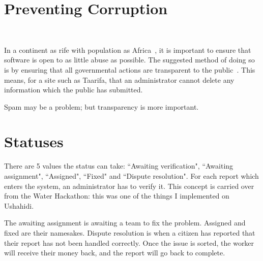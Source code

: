 \appendix

\chapter{Preventing Corruption}
~\label{app:corruption}

In a continent as rife with population as Africa~\cite{corruption}, it is important to ensure that software is open to as little abuse as possible. The suggested method of doing so is by ensuring that all governmental actions are transparent to the public~\cite{transparency}. This means, for a site such as Taarifa, that an administrator cannot delete any information which the public has submitted.

Spam may be a problem; but transparency is more important.

\chapter{Statuses}
\label{app:statuses}

There are 5 values the status can take: ``Awaiting verification", ``Awaiting assignment", ``Assigned", ``Fixed" and ``Dispute resolution". For each report which enters the system, an administrator has to verify it. This concept is carried over from the Water Hackathon: this was one of the things I implemented on Ushahidi.

The awaiting assignment is awaiting a team to fix the problem. Assigned and fixed are their namesakes. Dispute resolution is when a citizen has reported that their report has not been handled correctly. Once the issue is sorted, the worker will receive their money back, and the report will go back to complete.
